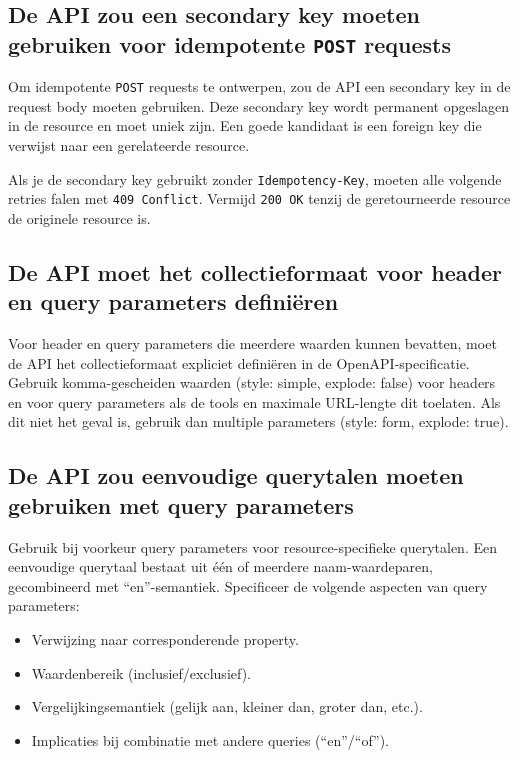 \subsection{De API zou een secondary key moeten gebruiken voor idempotente \texttt{POST} requests}
\label{subsection:secondary_key_idempotent_post}

Om idempotente \texttt{POST} requests te ontwerpen, zou de API een secondary key in de request body moeten gebruiken. Deze secondary key wordt permanent opgeslagen in de resource en moet uniek zijn. Een goede kandidaat is een foreign key die verwijst naar een gerelateerde resource.

Als je de secondary key gebruikt zonder \texttt{Idempotency-Key}, moeten alle volgende retries falen met \texttt{409 Conflict}. Vermijd \texttt{200 OK} tenzij de geretourneerde resource de originele resource is.

\subsection{De API moet het collectieformaat voor header en query parameters definiëren}
\label{subsection:collectieformaat_parameters}

Voor header en query parameters die meerdere waarden kunnen bevatten, moet de API het collectieformaat expliciet definiëren in de OpenAPI-specificatie. Gebruik komma-gescheiden waarden (style: simple, explode: false) voor headers en voor query parameters als de tools en maximale URL-lengte dit toelaten. Als dit niet het geval is, gebruik dan multiple parameters (style: form, explode: true).

\subsection{De API zou eenvoudige querytalen moeten gebruiken met query parameters}
\label{subsection:eenvoudige_querytalen}

Gebruik bij voorkeur query parameters voor resource-specifieke querytalen. Een eenvoudige querytaal bestaat uit één of meerdere naam-waardeparen, gecombineerd met ``en''-semantiek. Specificeer de volgende aspecten van query parameters:

\begin{itemize}
    \item Verwijzing naar corresponderende property.
    \item Waardenbereik (inclusief/exclusief).
    \item Vergelijkingsemantiek (gelijk aan, kleiner dan, groter dan, etc.).
    \item Implicaties bij combinatie met andere queries (``en''/``of'').
\end{itemize}

